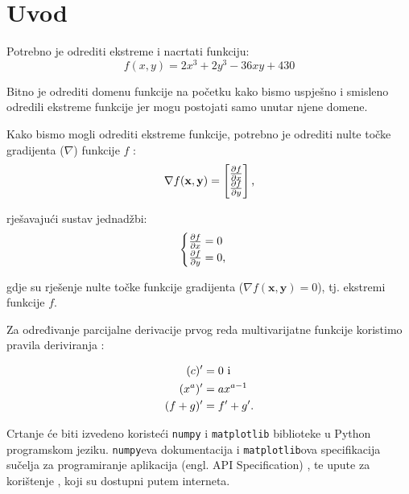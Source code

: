 \chapter{Uvod}

Potrebno je odrediti ekstreme i nacrtati funkciju:
\begin{equation}
f(x, y) = 2x^3 + 2y^3 - 36xy + 430
\end{equation}

Bitno je odrediti domenu funkcije na početku kako bismo uspješno i smisleno odredili ekstreme funkcije jer mogu postojati samo unutar njene domene.

Kako bismo mogli odrediti ekstreme funkcije, potrebno je odrediti nulte točke gradijenta ($\nabla$) funkcije $f$ \cite{ccalc}:
\begin{equation}
    \nabla f(\mathbf{x}, \mathbf{y}) = \begin{bmatrix}
        \frac{\partial f}{\partial x} \\
        \frac{\partial f}{\partial y}
    \end{bmatrix}\textnormal{,}
\end{equation}

rješavajući sustav jednadžbi:
\begin{equation}
    \begin{cases}
        \frac{\partial f}{\partial x} = 0 \\
        \frac{\partial f}{\partial y} = 0 \textnormal{,}
    \end{cases}
\end{equation}

gdje su rješenje nulte točke funkcije gradijenta ($\nabla f(\mathbf{x}, \mathbf{y}) = 0$), tj. ekstremi funkcije $f$.

Za određivanje parcijalne derivacije prvog reda multivarijatne funkcije koristimo pravila deriviranja \cite{kolegij}:

\begin{align}
    (c)' &= 0 \text{ i }\\
    (x^a)' &= ax^{a-1}\\
    (f + g)' &= f' + g' \textnormal{.}
\end{align}

\vspace*{20pt}

Crtanje će biti izvedeno koristeći \verb|numpy| i \verb|matplotlib| biblioteke u Python programskom jeziku.
\verb|numpy|eva dokumentacija\cite{numpy_doc} i \verb|matplotlib|ova specifikacija sučelja za programiranje aplikacija (engl. API Specification) \cite{mpl_api}, te upute za korištenje \cite{mpl_ug}, koji su dostupni putem interneta.

\newpage

